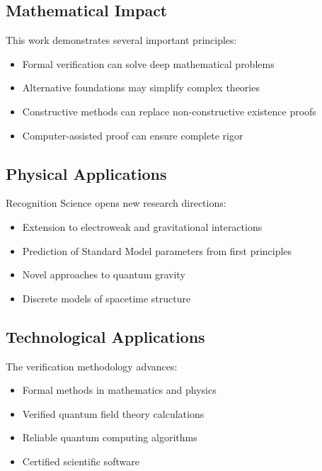 \documentclass[11pt]{amsart}
\begin{document}
\subsection{Mathematical Impact}

This work demonstrates several important principles:

\begin{itemize}
\item Formal verification can solve deep mathematical problems
\item Alternative foundations may simplify complex theories
\item Constructive methods can replace non-constructive existence proofs
\item Computer-assisted proof can ensure complete rigor
\end{itemize}

\subsection{Physical Applications}

Recognition Science opens new research directions:

\begin{itemize}
\item Extension to electroweak and gravitational interactions
\item Prediction of Standard Model parameters from first principles  
\item Novel approaches to quantum gravity
\item Discrete models of spacetime structure
\end{itemize}

\subsection{Technological Applications}

The verification methodology advances:

\begin{itemize}
\item Formal methods in mathematics and physics
\item Verified quantum field theory calculations
\item Reliable quantum computing algorithms
\item Certified scientific software
\end{itemize}

\appendix
\end{document}
